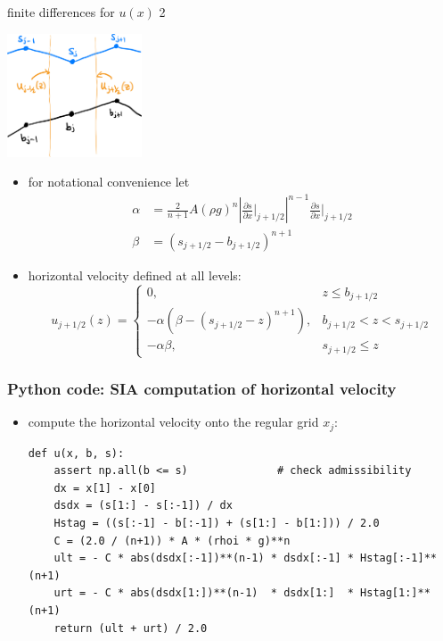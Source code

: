 \documentclass[10pt,dvipsnames]{beamer}
\begin{document}
\begin{frame}{finite differences for $u(x)$ 2}

\begin{center}
\includegraphics[width=0.3\textwidth]{staggered}
\end{center}

\begin{itemize}
\item for notational convenience let
\begin{align*}
\alpha &= \frac{2}{n+1} A (\rho g)^n \left|\frac{\partial s}{\partial x}\Big|_{j+1/2}\right|^{n-1} \frac{\partial s}{\partial x}\Big|_{j+1/2} \\
\beta  &= \left(s_{j+1/2} - b_{j+1/2}\right)^{n+1}
\end{align*}
\item \alert{horizontal velocity defined at all levels}:
    $$u_{j+1/2}(z) = \begin{cases} 0, & z \le b_{j+1/2} \\
                                   -\alpha \left(\beta - (s_{j+1/2} - z)^{n+1}\right), & b_{j+1/2} < z < s_{j+1/2} \\
                                   -\alpha \beta, & s_{j+1/2} \le z \end{cases}$$
\end{itemize}
\end{frame}


\begin{frame}[fragile]
\frametitle{Python code: SIA computation of horizontal velocity}

\begin{itemize}
\item compute the horizontal velocity onto the regular grid $x_j$:
\begin{lstlisting}[language=PythonPlus]
def u(x, b, s):
    assert np.all(b <= s)              # check admissibility
    dx = x[1] - x[0]
    dsdx = (s[1:] - s[:-1]) / dx
    Hstag = ((s[:-1] - b[:-1]) + (s[1:] - b[1:])) / 2.0
    C = (2.0 / (n+1)) * A * (rhoi * g)**n
    ult = - C * abs(dsdx[:-1])**(n-1) * dsdx[:-1] * Hstag[:-1]**(n+1)
    urt = - C * abs(dsdx[1:])**(n-1)  * dsdx[1:]  * Hstag[1:]**(n+1)
    return (ult + urt) / 2.0
\end{lstlisting}
\end{itemize}
\end{frame}
\end{document}
